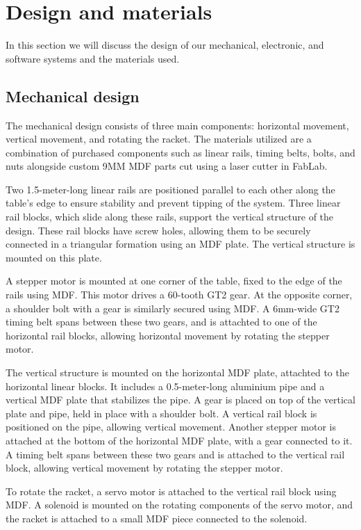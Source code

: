 \chapter{Design and materials}
In this section we will discuss the design of our mechanical, electronic, and software systems and the materials used.

\section{Mechanical design}
The mechanical design consists of three main components: horizontal movement, vertical movement, and rotating the racket. 
The materials utilized are a combination of purchased components such as linear rails, timing belts, bolts, and nuts 
alongside custom 9MM MDF parts cut using a laser cutter in FabLab.

Two 1.5-meter-long linear rails are positioned parallel to each other along the table's edge to ensure stability and prevent tipping of the system. 
Three linear rail blocks, which slide along these rails, support the vertical structure of the design. 
These rail blocks have screw holes, allowing them to be securely connected in a triangular formation using an MDF plate.
The vertical structure is mounted on this plate.

A stepper motor is mounted at one corner of the table, fixed to the edge of the rails using MDF. 
This motor drives a 60-tooth GT2 gear. 
At the opposite corner, a shoulder bolt with a gear is similarly secured using MDF. 
A 6mm-wide GT2 timing belt spans between these two gears, and is attachted to one of the horizontal rail blocks, allowing horizontal movement by rotating the stepper motor.

The vertical structure is mounted on the horizontal MDF plate, attachted to the horizontal linear blocks. 
It includes a 0.5-meter-long aluminium pipe and a vertical MDF plate that stabilizes the pipe.
A gear is placed on top of the vertical plate and pipe, held in place with a shoulder bolt.
A vertical rail block is positioned on the pipe, allowing vertical movement.
Another stepper motor is attached at the bottom of the horizontal MDF plate, with a gear connected to it.
A timing belt spans between these two gears and is attached to the vertical rail block, allowing vertical movement by rotating the stepper motor.

To rotate the racket, a servo motor is attached to the vertical rail block using MDF. 
A solenoid is mounted on the rotating components of the servo motor, and the racket is attached to a small MDF piece connected to the solenoid.
 
